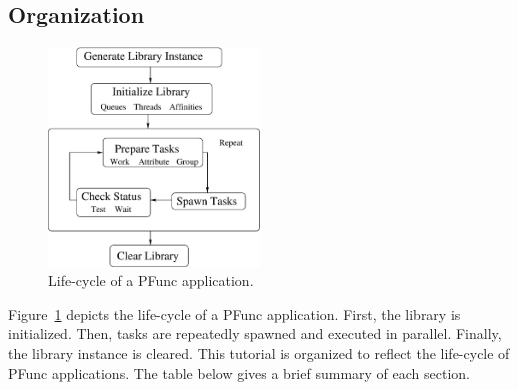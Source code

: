 \subsection{Organization}
\label{subsec:organization}
%
\begin{figure}[t]
\centering
\includegraphics[width=0.5\textwidth]{figs/life-cycle}
\caption{Life-cycle of a PFunc application.}
\label{fig:life_cycle}
\end{figure}
%
Figure~\ref{fig:life_cycle} depicts the life-cycle of a PFunc
application. 
%
First, the library is initialized. Then, tasks are repeatedly spawned and
executed in parallel.  Finally, the library instance is cleared.
%
This tutorial is organized to reflect the life-cycle of PFunc applications.
%
The table below gives a brief summary of each section.
% 
